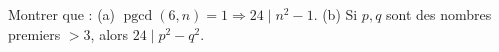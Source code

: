 Montrer que : (a) $\operatorname{pgcd}(6, n) = 1 \Rightarrow 24 \mid n^2 - 1$. (b) Si $p, q$ sont des nombres premiers $> 3$, alors $24 \mid p^2 - q^2$.
